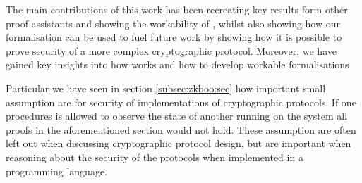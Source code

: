 The main contributions of this work has been recreating key results form other
proof assistants and showing the workability of \easycrypt, whilst also showing
how our formalisation can be used to fuel future work by showing how it is
possible to prove security of a more complex cryptographic protocol.
Moreover, we have gained key insights into how \easycrypt works and how to
develop workable formalisations

Particular we have seen in section \ref{subsec:zkboo:sec} how important small
assumption are for security of implementations of cryptographic protocols. If
one procedures is allowed to observe the state of another running on the system
all proofs in the aforementioned section would not hold. These assumption are
often left out when discussing cryptographic protocol design, but are important
when reasoning about the security of the protocols when implemented in a
programming language.

